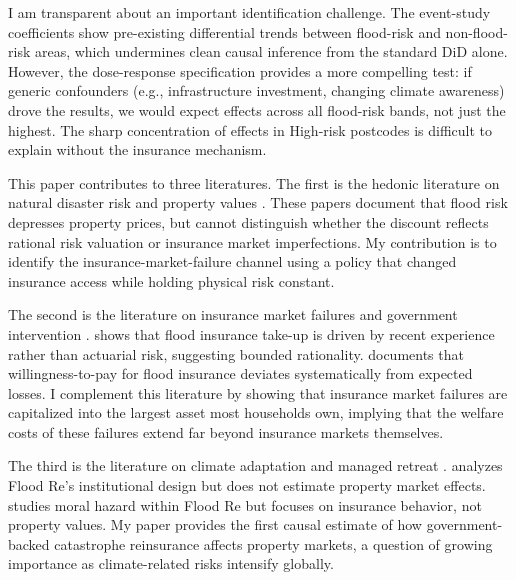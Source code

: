 \documentclass[12pt]{article}
\begin{document}
I am transparent about an important identification challenge. The event-study coefficients show pre-existing differential trends between flood-risk and non-flood-risk areas, which undermines clean causal inference from the standard DiD alone. However, the dose-response specification provides a more compelling test: if generic confounders (e.g., infrastructure investment, changing climate awareness) drove the results, we would expect effects across all flood-risk bands, not just the highest. The sharp concentration of effects in High-risk postcodes is difficult to explain without the insurance mechanism.

This paper contributes to three literatures. The first is the hedonic literature on natural disaster risk and property values \citep{bin2004effects, beltran2018flood, atreya2013forgetting, hallstrom2005market, bernstein2019disaster, murfin2020sea}. These papers document that flood risk depresses property prices, but cannot distinguish whether the discount reflects rational risk valuation or insurance market imperfections. My contribution is to identify the insurance-market-failure channel using a policy that changed insurance access while holding physical risk constant.

The second is the literature on insurance market failures and government intervention \citep{arrow1963uncertainty, kunreuther1978disaster, jaffee2010role, gallagher2014learning, botzen2009bounded}. \citet{gallagher2014learning} shows that flood insurance take-up is driven by recent experience rather than actuarial risk, suggesting bounded rationality. \citet{botzen2009bounded} documents that willingness-to-pay for flood insurance deviates systematically from expected losses. I complement this literature by showing that insurance market failures are capitalized into the largest asset most households own, implying that the welfare costs of these failures extend far beyond insurance markets themselves.

The third is the literature on climate adaptation and managed retreat \citep{kousky2014informing, surminski2016flood, hudson2020moral}. \citet{surminski2016flood} analyzes Flood Re's institutional design but does not estimate property market effects. \citet{hudson2020moral} studies moral hazard within Flood Re but focuses on insurance behavior, not property values. My paper provides the first causal estimate of how government-backed catastrophe reinsurance affects property markets, a question of growing importance as climate-related risks intensify globally.
\end{document}
